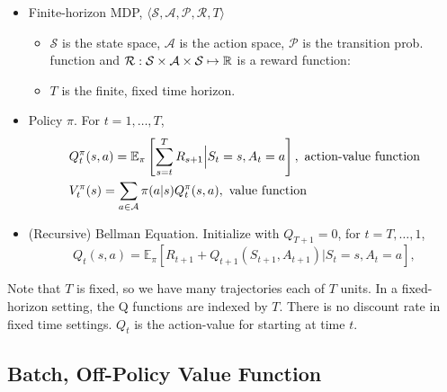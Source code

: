 \documentclass[11pt]{article}
\begin{document}
\begin{itemize}
\item Finite-horizon MDP,
  $\langle \mathcal{S}, \mathcal{A}, \mathcal{P}, \mathcal{R}, T \rangle$
  \begin{itemize}
  \item $\mathcal{S}$ is the state space, $\mathcal{A}$ is the action space, $\mathcal{P}$ is the transition prob. function and  $\mathcal{R} : \mathcal{S} \times \mathcal{A} \times \mathcal{S}  \mapsto \mathbb{R}$ is a reward  function:  
    
  \item $T$ is the finite, fixed time horizon. 
    
    
  \end{itemize} 
  
\item  Policy $\pi$. For  $t = 1,\dots, T$,  
  \begin{align*}
    & Q_t^\pi(s, a)  = \mathbb{E}_\pi \left[\sum_{s=t}^{T} R_{s+1} \Big| S_{t} = s, A_t = a\right], \hbox{ action-value function}\\
    & V_t^\pi(s)  = \sum_{a \in \mathcal{A}} \pi(a|s) Q_t^\pi(s, a), \hbox{ value function}
  \end{align*}
  
\item (Recursive) Bellman Equation. Initialize with $Q_{T+1} = 0$, for $t = T, \dots, 1$,
  \[
    Q_t(s, a) = \mathbb{E}_\pi[R_{t+1}+Q_{t+1}(S_{t+1}, A_{t+1})|S_t=s, A_t=a], 
  \]
\end{itemize}

Note that $T$ is fixed, so we have many trajectories each of $T$ units. In a fixed-horizon setting, the Q functions are indexed by $T$. There is no discount rate in fixed time settings. $Q_t$ is the action-value for starting at time $t$. 

\subsection{Batch, Off-Policy Value Function}
\end{document}
